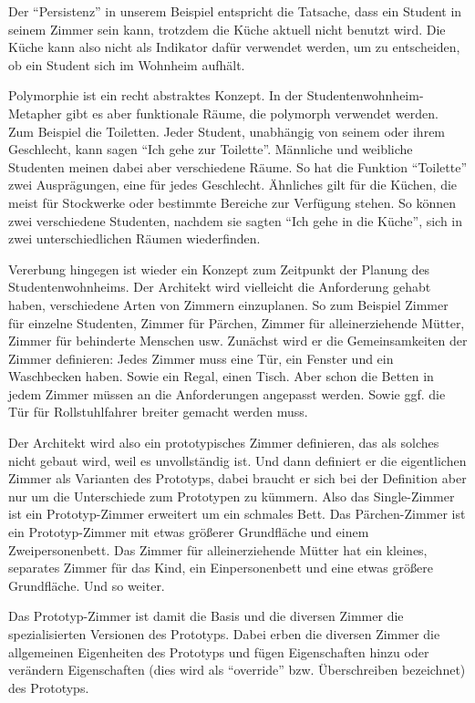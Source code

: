 Der "`Persistenz"' in unserem Beispiel entspricht die Tatsache, dass ein Student in seinem Zimmer sein kann, trotzdem die Küche aktuell nicht benutzt wird. Die Küche kann also nicht als Indikator dafür verwendet werden, um zu entscheiden, ob ein Student sich im Wohnheim aufhält. 

Polymorphie ist ein recht abstraktes Konzept. In der Studentenwohnheim-Metapher gibt es aber funktionale Räume, die polymorph verwendet werden. Zum Beispiel die Toiletten. Jeder Student, unabhängig von seinem oder ihrem Geschlecht, kann sagen "`Ich gehe zur Toilette"'. Männliche und weibliche Studenten meinen dabei aber verschiedene Räume. So hat die Funktion "`Toilette"' zwei Ausprägungen, eine für jedes Geschlecht. Ähnliches gilt für die Küchen, die meist für Stockwerke oder bestimmte Bereiche zur Verfügung stehen. So können zwei verschiedene Studenten, nachdem sie sagten "`Ich gehe in die Küche"', sich in zwei unterschiedlichen Räumen wiederfinden. 

Vererbung hingegen ist wieder ein Konzept zum Zeitpunkt der Planung des Studentenwohnheims. Der Architekt wird vielleicht die Anforderung gehabt haben, verschiedene Arten von Zimmern einzuplanen. So zum Beispiel Zimmer für einzelne Studenten, Zimmer für Pärchen, Zimmer für alleinerziehende Mütter, Zimmer für behinderte Menschen usw. Zunächst wird er die Gemeinsamkeiten der Zimmer definieren: Jedes Zimmer muss eine Tür, ein Fenster und ein Waschbecken haben. Sowie ein Regal, einen Tisch. Aber schon die Betten in jedem Zimmer müssen an die Anforderungen angepasst werden. Sowie ggf. die Tür für Rollstuhlfahrer breiter gemacht werden muss. 

Der Architekt wird also ein prototypisches Zimmer definieren, das als solches nicht gebaut wird, weil es unvollständig ist. Und dann definiert er die eigentlichen Zimmer als Varianten des Prototyps, dabei braucht er sich bei der Definition aber nur um die Unterschiede zum Prototypen zu kümmern. Also das Single-Zimmer ist ein Prototyp-Zimmer erweitert um ein schmales Bett. Das Pärchen-Zimmer ist ein Prototyp-Zimmer mit etwas größerer Grundfläche und einem Zweipersonenbett. Das Zimmer für alleinerziehende Mütter hat ein kleines, separates Zimmer für das Kind, ein Einpersonenbett und eine etwas größere Grundfläche. Und so weiter. 

Das Prototyp-Zimmer ist damit die Basis und die diversen Zimmer die spezialisierten Versionen des Prototyps. Dabei erben die diversen Zimmer die allgemeinen Eigenheiten des Prototyps und fügen Eigenschaften hinzu oder verändern Eigenschaften (dies wird als "`override"' bzw. Überschreiben bezeichnet) des Prototyps. 

